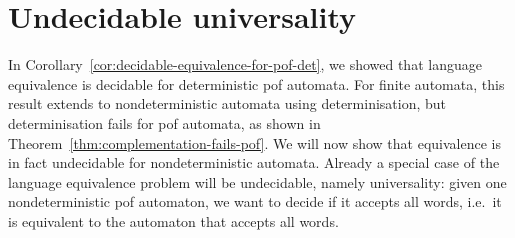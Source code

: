 \exercisepart



\section{Undecidable universality}
\label{sec:undecidable-universality}
In Corollary~\ref{cor:decidable-equivalence-for-pof-det}, we showed that language equivalence is decidable for deterministic pof automata. For finite automata, this result extends to nondeterministic automata using determinisation, but determinisation fails for  pof automata, as shown in Theorem~\ref{thm:complementation-fails-pof}. 
We will now show that  equivalence is in fact undecidable for nondeterministic automata. Already a special case of the language equivalence problem will be undecidable, namely universality: given one nondeterministic pof automaton, we want to decide if it accepts all words, i.e.~it is equivalent to the automaton that accepts all words.  

